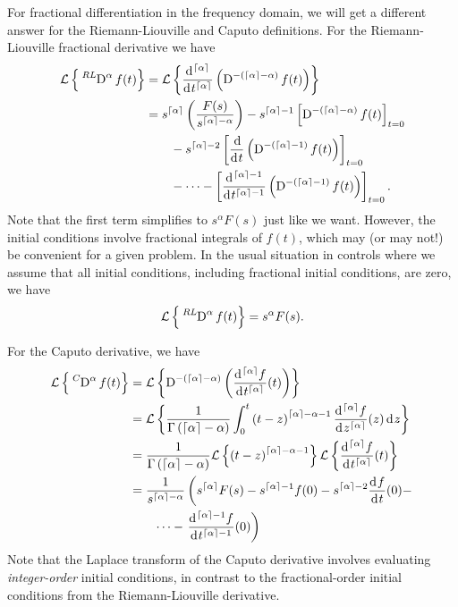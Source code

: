     For fractional differentiation in the frequency domain, we will get a different answer for the Riemann-Liouville and Caputo definitions. 
For the Riemann-Liouville fractional derivative we have
\begin{align*}
  \mathcal L \left\{ \tensor*[^{RL}]{\D}{^\alpha} f(t) \right\} &= \mathcal L \left\{  \frac{\d^{\lc \alpha \rc}}{\d t^{\lc \alpha \rc}} \left( \tensor*[]{\D}{^{-(\lc \alpha \rc - \alpha)}} f(t) \right) \right\} \\
  &=  s^{\lc \alpha \rc} \left( \frac{F(s)}{s^{\lc \alpha \rc - \alpha}}  \right)  - s^{\lc \alpha \rc - 1} \left[   \tensor*[]{\D}{^{-(\lc \alpha \rc - \alpha)}} f(t) \right]_{t=0} \\
  & \qquad - s^{\lc \alpha \rc - 2} \left[ \frac{\d}{\d t}\left( \tensor*[]{\D}{^{-(\lc \alpha \rc - 1)}}f(t) \right) \right]_{t=0} \\
  & \qquad - \cdots -  \left[ \frac{\d^{\lc \alpha \rc - 1}}{\d t^{\lc \alpha \rc - 1}}\left( \tensor*[]{\D}{^{-(\lc \alpha \rc - 1)}}f(t) \right) \right]_{t=0}. 
\end{align*}
Note that the first term simplifies to $s^\alpha F(s)$ just like we want. However, the initial conditions involve fractional integrals of $f(t)$, which may (or may not!) be convenient for a given problem. In the usual situation in controls where we assume that all initial conditions, including fractional initial conditions, are zero, we have 
\begin{equation*}
  \mathcal L \left\{ \tensor*[^{RL}]{\D}{^\alpha} f(t) \right\} = s^\alpha F(s).
\end{equation*}

For the Caputo derivative, we have
\begin{align*}
  \mathcal L \left\{ \tensor*[^C]{\D}{^\alpha} f(t) \right\} &= \mathcal L \left\{ 
      \tensor*[]{\D}{^{-( \lc \alpha \rc - \alpha)}} \left( \frac{\d^{\lc \alpha \rc} f}{\d t^{\lc \alpha \rc}}(t) \right) \right\} \\
      &= \mathcal L \left\{ 
	\frac{1}{\Gamma\left(\lc \alpha \rc - \alpha \right)} \int_0^t \left( t - z \right)^{\lc \alpha \rc - \alpha - 1}  \frac{\d^{\lc \alpha \rc}f}{\d z^{\lc \alpha \rc}} (z) \d z \right\} \\
	&= \frac{1}{\Gamma \left( \lc \alpha \rc - \alpha \right)} \mathcal L \left\{ \left( t - z \right)^{\lc \alpha \rc - \alpha - 1} \right\} \mathcal L \left\{  \frac{\d^{\lc \alpha \rc}f}{\d t^{\lc \alpha \rc}} (t) \right\} \\
	&= \frac{1}{s^{\lc \alpha \rc - \alpha}} \left( s^{\lc \alpha \rc} F(s) - s^{\lc \alpha \rc - 1} f(0) - s^{\lc \alpha \rc - 2} \frac{\d f}{\d t}(0) - \right. \\
	& \qquad \cdots - \left. \frac{\d^{\lc \alpha \rc - 1}f}{\d t^{\lc \alpha \rc - 1}}(0) \right) 
\end{align*}
Note that the Laplace transform of the Caputo derivative involves evaluating \emph{integer-order} initial conditions, in contrast to the fractional-order initial conditions from the Riemann-Liouville derivative.


